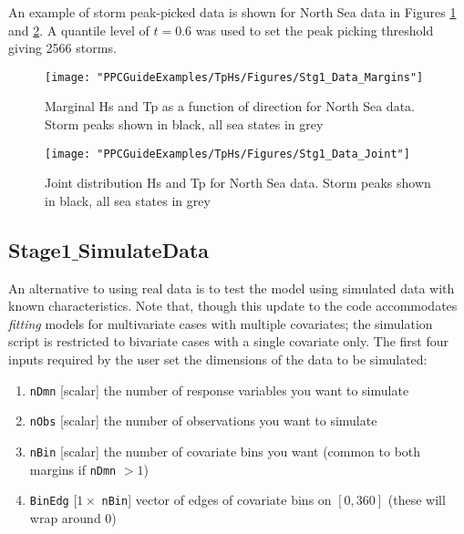 An example of storm peak-picked data is shown for North Sea data in Figures \ref{fig:Stg1_Data_Margins} and \ref{fig:Stg1_Data_Joint}. A quantile level of $t=0.6$ was used to set the peak picking threshold giving 2566 storms.

\begin{figure}
\centering
\texttt{[image: "PPCGuideExamples/TpHs/Figures/Stg1\_Data\_Margins"]}
\caption{Marginal Hs and Tp as a function of direction for North Sea data. Storm peaks shown in black, all sea states in grey} 
\label{fig:Stg1_Data_Margins}
\end{figure}

\begin{figure}
\centering
\texttt{[image: "PPCGuideExamples/TpHs/Figures/Stg1\_Data\_Joint"]}
\caption{Joint distribution Hs and Tp  for North Sea data. Storm peaks shown in black, all sea states in grey} 
\label{fig:Stg1_Data_Joint}
\end{figure}

\subsection{Stage1$\_$SimulateData}
An alternative to using real data is to test the model using simulated data with known characteristics. Note that, though this update to the code accommodates \emph{fitting} models for multivariate cases with multiple covariates; the simulation script is restricted to bivariate cases with a single covariate only. The first four inputs required by the user set the dimensions of the data to be simulated:


\begin{enumerate}
\item \verb+nDmn+ [scalar] the number of response variables you want to simulate
\item \verb+nObs+ [scalar] the number of observations you want to simulate 
\item \verb+nBin+ [scalar] the number of covariate bins you want (common to both margins if \verb+nDmn+ $> 1$)
\item \verb+BinEdg+ [$1 \times $ \verb+nBin+] vector of edges of covariate bins on $[0,360]$ (these will wrap around 0)
\end{enumerate}

